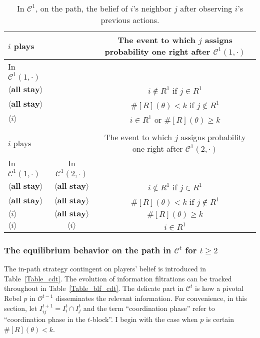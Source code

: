 \documentclass[12pt,letter]{article}
\newcommand{\Kappa}{\mathcal{C}}
\newcommand{\Omicron}{\mathcal{O}}
\theoremstyle{definition}
\theoremstyle{remark}
\theoremstyle{claim}
\begin{document}
\begin{table}[!htbp]
\caption{In $\Kappa^1$, on the path, the belief of $i$'s neighbor $j$ after observing $i$'s previous actions.}
\label{Table_blf_cd0}
\begin{center}
\begin{tabular}{l  c | c}
 	$i$ plays	  			&	  &  The event to which $j$ assigns probability one  right after $\Kappa^1(1,\cdot)$\\
\hline
\hline
In $\Kappa^1(1,\cdot)$	&		&		  \\
\hline
  $\langle \textbf{all stay} \rangle$	& &   $i\notin R^1$ if $j\in R^1$ \\
  $\langle \textbf{all stay} \rangle$	&  &  $\#[R](\theta)< k$ if $j\notin R^1$\\
  $\langle i \rangle$	&	&  $i\in R^1$ or $\#[R](\theta)\geq k$    \\
  \hline
  \\
 	$i$ plays	  	&  	  &The event to which $j$ assigns probability one  right after $\Kappa^1(2,\cdot)$\\
\hline
\hline
	In $\Kappa^1(1,\cdot)$		&			In $\Kappa^1(2,\cdot)$	&  \\
\hline
  $\langle \textbf{all stay} \rangle$	&  $\langle \textbf{all stay} \rangle$ &  $i\notin R^1$ if $j\in R^1$ \\
  $\langle \textbf{all stay} \rangle$	&  $\langle \textbf{all stay} \rangle$ &  $\#[R](\theta)< k$ if $j\notin R^1$\\
  $\langle i \rangle$	&	$\langle \textbf{all stay} \rangle$ &  $\#[R](\theta)\geq k$    \\
  $\langle i \rangle$	&	$\langle i \rangle$ &  $i\in R^1$  \\
  \hline
\end{tabular}
\end{center}
\end{table}




\subsubsection{The equilibrium behavior on the path in $\Kappa^t$ for $t\geq 2$}
\label{sec:cdt}
The in-path strategy contingent on players' belief is introduced in Table~\ref{Table_cdt}. The evolution of information filtrations can be tracked throughout in Table~\ref{Table_blf_cdt}. The delicate part in $\Kappa^t$ is how a pivotal Rebel $p$ in $\Omicron^{t-1}$ disseminates the relevant information. For convenience, in this section, let $I^{t+1}_{ij}=I^t_i\cap I^t_j$ and the term ``coordination phase'' refer to ``coordination phase in the $t$-block''. I begin with the case when $p$ is certain $\#[R](\theta)< k$.
\end{document}
